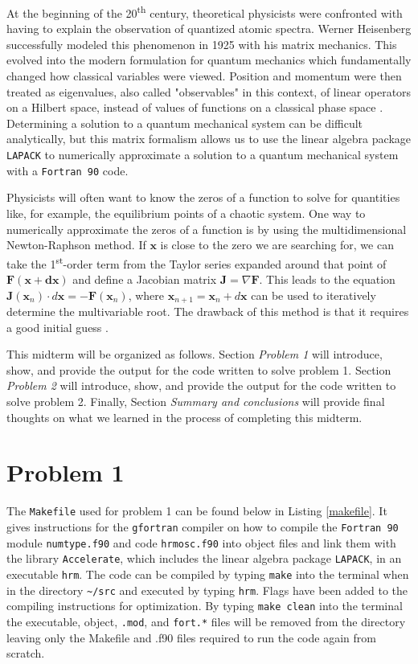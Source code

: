 \documentclass[12pt]{article}
\begin{document}
At the beginning of the 20\textsuperscript{th} century, theoretical physicists were confronted with having to explain the observation of quantized atomic spectra.  Werner Heisenberg successfully modeled this phenomenon in 1925 with his matrix mechanics.  This evolved into the modern formulation for quantum mechanics which fundamentally changed how classical variables were viewed.  Position and momentum were then treated as eigenvalues, also called "observables" in this context, of linear operators on a Hilbert space, instead of values of functions on a classical phase space \cite{wikimath}.  Determining a solution to a quantum mechanical system can be difficult analytically, but this matrix formalism allows us to use the linear algebra package {\tt LAPACK} to numerically approximate a solution to a quantum mechanical system with a {\tt Fortran 90} code.  

Physicists will often want to know the zeros of a function to solve for quantities like, for example, the equilibrium points of a chaotic system.  One way to numerically approximate the zeros of a function is by using the multidimensional Newton-Raphson method.  If $\textbf{x}$ is close to the zero we are searching for, we can take the 1\textsuperscript{st}-order term from the Taylor series expanded around that point of $\textbf{F}(\textbf{x}+\textbf{dx})$ and define a Jacobian matrix $\textbf{J}=\nabla{\textbf{F}}$.  This leads to the equation $\textbf{J}(\textbf{x}_n)\cdot d\textbf{x}=-\textbf{F}(\textbf{x}_n)$, where $\textbf{x}_{n+1}=\textbf{x}_n +d\textbf{x}$ can be used to iteratively determine the multivariable root.  The drawback of this method is that it requires a good initial guess \cite{notes}.

This midterm will be organized as follows.  Section \emph{Problem 1} will introduce, show, and provide the output for the code written to solve problem 1.  Section \emph{Problem 2} will introduce, show, and provide the output for the code written to solve problem 2.  Finally, Section \emph{Summary and conclusions} will provide final thoughts on what we learned in the process of completing this midterm.

\section{Problem 1}

The {\tt Makefile} used for problem 1 can be found below in Listing \ref{makefile}.  It gives instructions for the {\tt gfortran} compiler on how to compile the {\tt Fortran 90} module {\tt numtype.f90} and code {\tt hrmosc.f90} into object files and link them with the library {\tt Accelerate}, which includes the linear algebra package {\tt LAPACK}, in an executable {\tt hrm}.  The code can be compiled by typing {\tt make} into the terminal when in the directory {\tt \verb|~/src|} and executed by typing {\tt hrm}.  Flags have been added to the compiling instructions for optimization.  By typing {\tt make clean} into the terminal the executable, object, {\tt *.mod}, and {\tt fort.*} files will be removed from the directory leaving only the Makefile and .f90 files required to run the code again from scratch.
\end{document}
